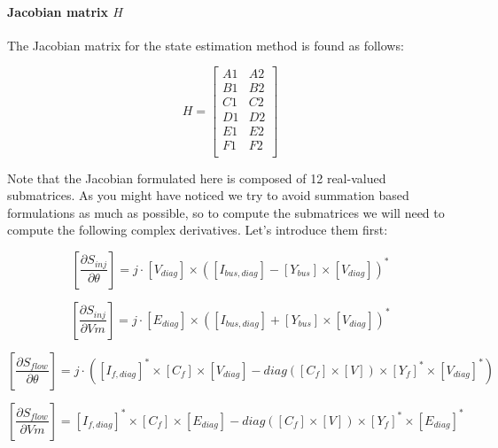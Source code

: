 \documentclass[nols,a4paper,twoside,symmetric,notoc,fleqn]{tufte-book}
\begin{document}
\paragraph{Jacobian matrix $H$}

The Jacobian matrix for the state estimation method is found as follows:

\begin{equation}
H=
\left[
\begin{array}{cc}
A1 &
A2 \\
B1 &
B2 \\
C1 &
C2 \\
D1 &
D2 \\
E1 &
E2 \\
F1 &
F2 \\
\end{array}
\right]
\label{SE_jacobian}
\end{equation}

Note that the Jacobian formulated here is composed of 12 real-valued submatrices. As you might have noticed we try to avoid summation based formulations as much as possible, so to compute the submatrices we will need to compute the following complex derivatives. Let's introduce them first:


\begin{equation}
\left[ \frac{\partial S_{inj}}{\partial \theta} \right]  = j \cdot [V_{diag}] \times ([I_{bus,diag}] - [Y_{bus}] \times [V_{diag}]  )^* 
\end{equation}

\begin{equation}
\left[ \frac{\partial S_{inj}}{\partial Vm} \right]  = j \cdot [E_{diag}] \times ([I_{bus,diag}] + [Y_{bus}] \times [V_{diag} ] )^* 
\end{equation}

	


\begin{equation}
\left[ \frac{\partial S_{flow}}{\partial \theta}  \right]   = j \cdot ([I_{f,diag}]^* \times [C_f] \times[ V_{diag}] - diag([C_f] \times [V]) \times [Y_f]^* \times [V_{diag}]^* ) 
\end{equation}

\begin{equation}
\left[ \frac{\partial S_{flow}}{\partial Vm} \right]    = [I_{f,diag}]^* \times [C_f] \times [E_{diag}] - diag([C_f] \times [V]) \times [Y_f]^* \times [E_{diag}]^* 
\end{equation}
\end{document}
